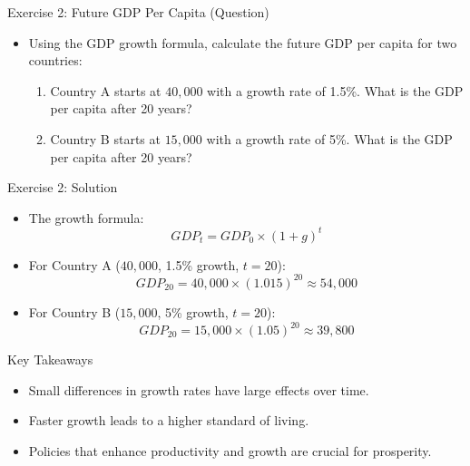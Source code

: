 \documentclass{beamer}
\begin{document}
\begin{frame}{Exercise 2: Future GDP Per Capita (Question)}
    \begin{itemize}
        \item Using the GDP growth formula, calculate the future GDP per capita for two countries:
        \begin{enumerate}
            \item Country A starts at $40,000$ with a growth rate of 1.5\%. What is the GDP per capita after 20 years?
            \item Country B starts at $15,000$ with a growth rate of 5\%. What is the GDP per capita after 20 years?
        \end{enumerate}
    \end{itemize}
\end{frame}

\begin{frame}{Exercise 2: Solution}
    \begin{itemize}
        \item The growth formula:
        \begin{equation*}
            GDP_{t} = GDP_{0} \times (1 + g)^t
        \end{equation*}
        \item For Country A ($40,000$, 1.5\% growth, $t=20$):
        \begin{equation*}
            GDP_{20} = 40,000 \times (1.015)^{20} \approx 54,000
        \end{equation*}
        \item For Country B ($15,000$, 5\% growth, $t=20$):
        \begin{equation*}
            GDP_{20} = 15,000 \times (1.05)^{20} \approx 39,800
        \end{equation*}
    \end{itemize}
\end{frame}

\begin{frame}{Key Takeaways}
    \begin{itemize}
        \item Small differences in growth rates have large effects over time.
        \item Faster growth leads to a higher standard of living.
        \item Policies that enhance productivity and growth are crucial for prosperity.
    \end{itemize}
\end{frame}
\end{document}

